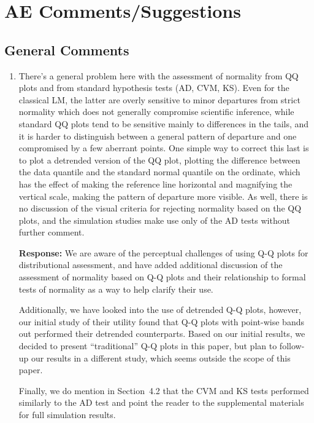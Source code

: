 \documentclass[11pt]{article}
\begin{document}
\section*{AE Comments/Suggestions}

\subsection*{General Comments}

\begin{enumerate}
\item There's a general problem here with the assessment of normality from QQ plots and from standard hypothesis tests (AD, CVM, KS). Even for the classical LM, the latter are overly sensitive to minor departures from strict normality which does not generally compromise scientific inference, while standard QQ plots tend to be sensitive mainly to differences in the tails, and it is harder to distinguish between a general pattern of departure and one compromised by a few aberrant points. One simple way to correct this last is to plot a detrended version of the QQ plot, plotting the difference between the data quantile and the standard normal quantile on the ordinate, which has the effect
of making the reference line horizontal and magnifying the vertical scale, making the pattern of departure more visible. As well, there is no discussion of the visual criteria for rejecting normality based on the QQ plots, and the simulation studies make use only of the AD tests without further comment.

\textbf{Response:} We are aware of the perceptual challenges of using Q-Q plots for distributional assessment, and have added additional discussion of the assessment of normality based on Q-Q plots and their relationship to formal tests of normality as a way to help clarify their use. 

Additionally, we have looked into the use of detrended Q-Q plots, however, our initial study of their utility found that Q-Q plots with point-wise bands out performed their detrended counterparts. Based on our initial results, we decided to present ``traditional'' Q-Q plots in this paper, but plan to follow-up our results in a different study, which seems outside the scope of this paper.

Finally, we do mention in Section~4.2 that the CVM and KS tests performed similarly to the AD test and point the reader to the supplemental materials for full simulation results. 



\end{enumerate}
\end{document}
